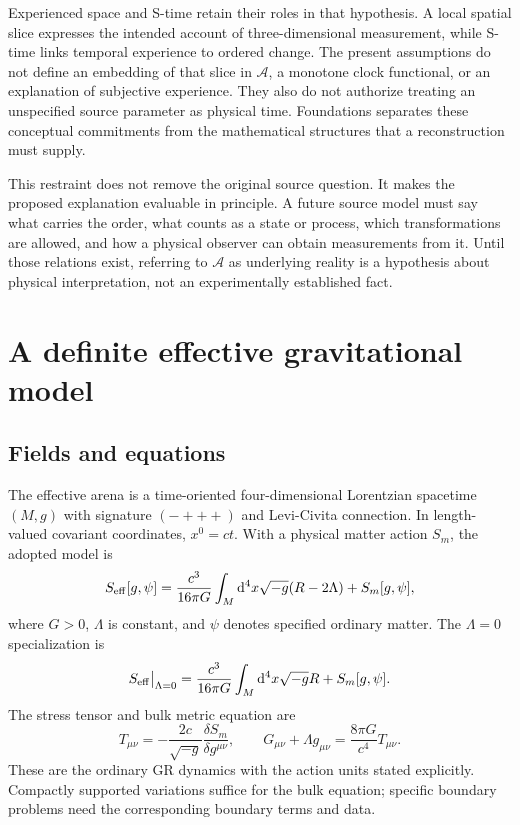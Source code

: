 \documentclass[11pt,oneside]{report}
\newcommand{\Sub}{\mathcal A}
\newcommand{\dd}{\mathrm d}
\theoremstyle{remark}
\numberwithin{definition}{chapter}
\numberwithin{proposition}{chapter}
\numberwithin{remark}{chapter}
\begin{document}
Experienced space and S-time retain their roles in that hypothesis. A local spatial slice expresses the intended account of three-dimensional measurement, while S-time links temporal experience to ordered change. The present assumptions do not define an embedding of that slice in $\Sub$, a monotone clock functional, or an explanation of subjective experience. They also do not authorize treating an unspecified source parameter as physical time. Foundations separates these conceptual commitments from the mathematical structures that a reconstruction must supply.

This restraint does not remove the original source question. It makes the proposed explanation evaluable in principle. A future source model must say what carries the order, what counts as a state or process, which transformations are allowed, and how a physical observer can obtain measurements from it. Until those relations exist, referring to $\Sub$ as underlying reality is a hypothesis about physical interpretation, not an experimentally established fact.

\section{A definite effective gravitational model}
\subsection{Fields and equations}
The effective arena is a time-oriented four-dimensional Lorentzian spacetime $(M,g)$ with signature $(-+++)$ and Levi-Civita connection. In length-valued covariant coordinates, $x^0=ct$. With a physical matter action $S_m$, the adopted model is
\begin{equation}
S_{\rm eff}[g,\psi]=\frac{c^3}{16\pi G}
\int_M\dd^4x\sqrt{-g}(R-2\Lambda)+S_m[g,\psi],
\label{exact_closure_flagship_article:eq:SeffLambda}
\end{equation}
where $G>0$, $\Lambda$ is constant, and $\psi$ denotes specified ordinary matter. The $\Lambda=0$ specialization is
\begin{equation}
S_{\rm eff}\big|_{\Lambda=0}=\frac{c^3}{16\pi G}
\int_M\dd^4x\sqrt{-g}R+S_m[g,\psi].
\label{exact_closure_flagship_article:eq:Seff}
\end{equation}
The stress tensor and bulk metric equation are
\begin{equation}
T_{\mu\nu}=-\frac{2c}{\sqrt{-g}}\frac{\delta S_m}{\delta g^{\mu\nu}},
\qquad G_{\mu\nu}+\Lambda g_{\mu\nu}=\frac{8\pi G}{c^4}T_{\mu\nu}.
\label{exact_closure_flagship_article:eq:Einstein}
\end{equation}
These are the ordinary GR dynamics with the action units stated explicitly. Compactly supported variations suffice for the bulk equation; specific boundary problems need the corresponding boundary terms and data.
\end{document}
